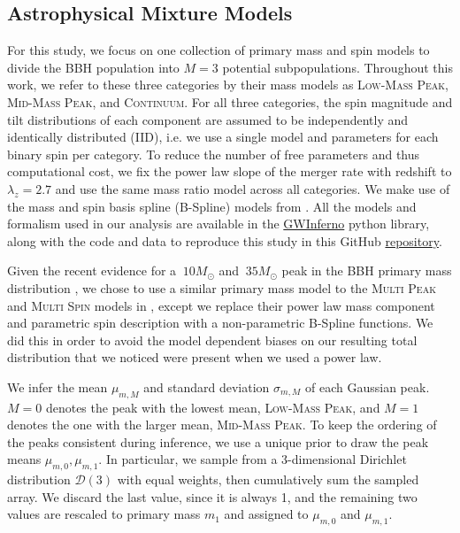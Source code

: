 \subsection{Astrophysical Mixture Models} \label{sec:astromodels}

For this study, we focus on one collection of primary mass and spin models to divide the BBH population into $M=3$ potential subpopulations. Throughout this work, we refer to these three categories by their mass models as \textsc{Low-Mass Peak}, \textsc{Mid-Mass Peak}, and \textsc{Continuum}. For all three categories, the spin magnitude and tilt distributions of each component are assumed to be independently and identically distributed (IID), i.e. we use a single model and parameters for each binary spin per category. To reduce the number of free parameters and thus computational cost, we fix the power law slope of the merger rate with redshift to $\lambda_z=2.7$ and use the same mass ratio model across all categories. We make use of the mass and spin basis spline (B-Spline) models from \cite{2022arXiv221012834E}. All the models and formalism used in our analysis are available in the \href{https://git.ligo.org/bruce.edelman/gwinferno}{GWInferno} python library, along with the code and data to reproduce this study in this GitHub \href{https://github.com/jaxeng/paper}{repository}. 

Given the recent evidence for a $~10 M_{\odot}$ and $~35 M_{\odot}$ peak in the BBH primary mass distribution \citep{2111.03634, 2022ApJ...928..155T, 10.3847/2041-8213/aa9bf6, 10.3847/1538-4357/aab34c, 10.3847/2041-8213/ab3800, 2021ApJ...913L...7A}, we chose to use a similar primary mass model to the \textsc{Multi Peak} and \textsc{Multi Spin} models in \cite{2021ApJ...913L...7A}, except we replace their power law mass component and parametric spin description with a non-parametric B-Spline functions. We did this in order to avoid the model dependent biases on our resulting total distribution that we noticed were present when we used a power law.

We infer the mean $\mu_{m,M}$ and standard deviation $\sigma_{m,M}$ of each Gaussian peak. $M=0$ denotes the peak with the lowest mean, \textsc{Low-Mass Peak}, and $M=1$ denotes the one with the larger mean, \textsc{Mid-Mass Peak}. To keep the ordering of the peaks consistent during inference, we use a unique prior to draw the peak means $\mu_{m,0}, \mu_{m,1}$. In particular, we sample from a 3-dimensional Dirichlet distribution $\mathcal{D}(3)$ with equal weights, then cumulatively sum the sampled array. We discard the last value, since it is always 1, and the remaining two values are rescaled to primary mass $m_1$ and assigned to $\mu_{m,0}$ and $\mu_{m,1}$. 


